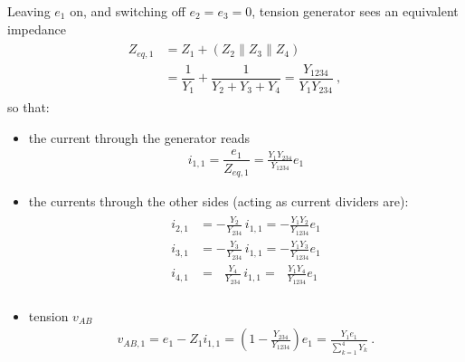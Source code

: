 \documentclass[letterpaper,10pt,english]{jupyterBook}
\begin{document}
\sphinxAtStartPar
{} Leaving \(e_1\) on, and switching off \(e_2 = e_3 = 0\), tension generator sees an equivalent impedance
\begin{equation*}
\begin{split}\begin{aligned}
  Z_{eq,1}
  & = Z_1 + (Z_2 \parallel Z_3 \parallel Z_4) \\
  & = \dfrac{1}{Y_1} + \dfrac{1}{Y_2 + Y_3 + Y_4} = \dfrac{Y_{1234}}{Y_1 Y_{234}}  \ ,
\end{aligned}\end{split}
\end{equation*}
\sphinxAtStartPar
so that:
\begin{itemize}
\item {} 
\sphinxAtStartPar
the current through the generator reads
\begin{equation*}
\begin{split}i_{1,1} = \dfrac{e_1}{Z_{eq,1}} = \frac{Y_1 Y_{234}}{Y_{1234}} e_1\end{split}
\end{equation*}
\item {} 
\sphinxAtStartPar
the currents through the other sides (acting as current dividers are):
\begin{equation*}
\begin{split}\begin{aligned}
      i_{2,1} & = -     \frac{Y_2}{Y_{234}} \, i_{1,1} = -     \frac{Y_1 Y_2}{Y_{1234}} e_1  \\
      i_{3,1} & = -     \frac{Y_3}{Y_{234}} \, i_{1,1} = -     \frac{Y_1 Y_3}{Y_{1234}} e_1  \\
      i_{4,1} & = \ \ \ \frac{Y_4}{Y_{234}} \, i_{1,1} = \ \ \ \frac{Y_1 Y_4}{Y_{1234}} e_1  \\
   \end{aligned}\end{split}
\end{equation*}
\item {} 
\sphinxAtStartPar
tension \(v_{AB}\)
\begin{equation*}
\begin{split}v_{AB,1} = e_1 - Z_1 i_{1,1} = \left( 1 - \frac{Y_{234}}{Y_{1234}} \right) e_1 = \frac{Y_1 e_1}{\sum_{k=1}^4 Y_k} \ . \end{split}
\end{equation*}
\end{itemize}
\end{document}
